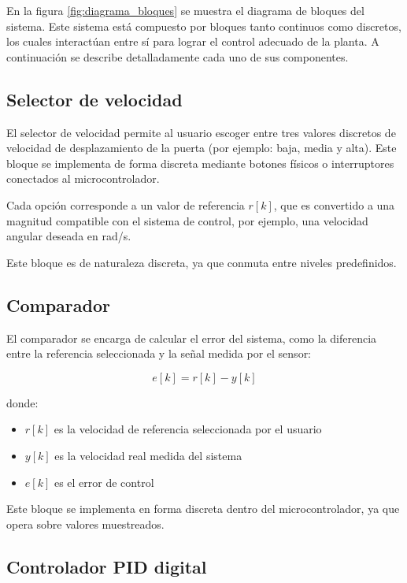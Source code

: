 \documentclass[letter,12pt]{article}
\begin{document}
En la figura \ref{fig:diagrama_bloques} se muestra el diagrama de bloques del sistema. Este sistema está compuesto por bloques tanto continuos como discretos, los cuales interactúan entre sí para lograr el control adecuado de la planta. A continuación se describe detalladamente cada uno de sus componentes.

\subsection{Selector de velocidad}

El selector de velocidad permite al usuario escoger entre tres valores discretos de velocidad de desplazamiento de la puerta (por ejemplo: baja, media y alta). Este bloque se implementa de forma discreta mediante botones físicos o interruptores conectados al microcontrolador.  

Cada opción corresponde a un valor de referencia $r[k]$, que es convertido a una magnitud compatible con el sistema de control, por ejemplo, una velocidad angular deseada en rad/s. 

Este bloque es de naturaleza discreta, ya que conmuta entre niveles predefinidos.

\subsection{Comparador}

El comparador se encarga de calcular el error del sistema, como la diferencia entre la referencia seleccionada y la señal medida por el sensor:

\begin{equation}
	e[k] = r[k] - y[k]
\end{equation}

donde:
\begin{itemize}
	\item $r[k]$ es la velocidad de referencia seleccionada por el usuario
	\item $y[k]$ es la velocidad real medida del sistema
	\item $e[k]$ es el error de control
\end{itemize}

Este bloque se implementa en forma discreta dentro del microcontrolador, ya que opera sobre valores muestreados.

\subsection{Controlador PID digital}
\end{document}
